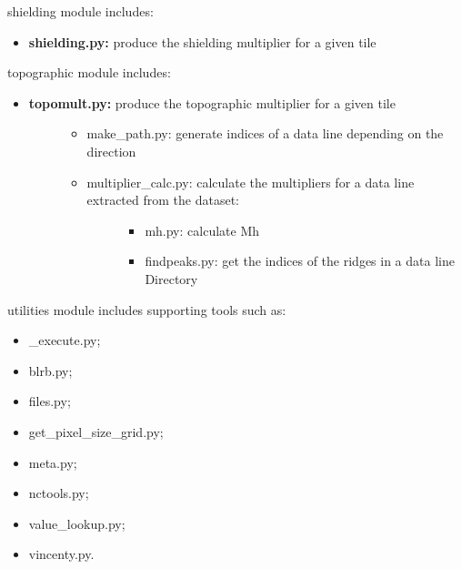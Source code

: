 \documentclass[letterpaper,10pt,english]{sphinxmanual}
\begin{document}
shielding module includes:
\begin{itemize}
\item {} 
\textbf{shielding.py:} produce the shielding multiplier for a given tile

\end{itemize}

topographic module includes:
\begin{itemize}
\item {} \begin{description}
\item[{\textbf{topomult.py:} produce the topographic multiplier for a given tile}] \leavevmode\begin{itemize}
\item {} 
make\_path.py: generate indices of a data line depending on the direction

\item {} \begin{description}
\item[{multiplier\_calc.py: calculate the multipliers for a data line extracted from the dataset:}] \leavevmode\begin{itemize}
\item {} 
mh.py: calculate Mh

\item {} 
findpeaks.py: get the indices of the ridges in a data line Directory

\end{itemize}

\end{description}

\end{itemize}

\end{description}

\end{itemize}

utilities module includes supporting tools such as:
\begin{itemize}
\item {} 
\_execute.py;

\item {} 
blrb.py;

\item {} 
files.py;

\item {} 
get\_pixel\_size\_grid.py;

\item {} 
meta.py;

\item {} 
nctools.py;

\item {} 
value\_lookup.py;

\item {} 
vincenty.py.

\end{itemize}
\end{document}
